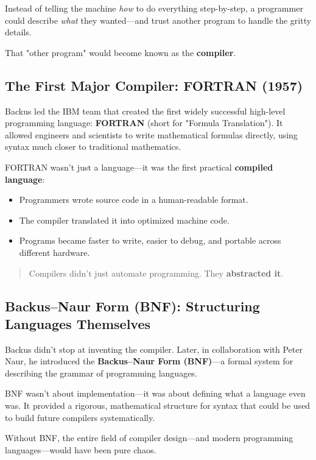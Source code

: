 Instead of telling the machine \textit{how} to do everything step-by-step, a programmer could describe \textit{what} they wanted—and trust another program to handle the gritty details.

That "other program" would become known as the \textbf{compiler}.

\subsection{The First Major Compiler: FORTRAN (1957)}

Backus led the IBM team that created the first widely successful high-level programming language: \textbf{FORTRAN} (short for "Formula Translation"). It allowed engineers and scientists to write mathematical formulas directly, using syntax much closer to traditional mathematics.

FORTRAN wasn't just a language—it was the first practical \textbf{compiled language}:

\begin{itemize} \item Programmers wrote source code in a human-readable format. \item The compiler translated it into optimized machine code. \item Programs became faster to write, easier to debug, and portable across different hardware. \end{itemize}

\begin{quote} Compilers didn’t just automate programming.
They \textbf{abstracted it}. \end{quote}

\subsection{Backus–Naur Form (BNF): Structuring Languages Themselves}

Backus didn’t stop at inventing the compiler.
Later, in collaboration with Peter Naur, he introduced the \textbf{Backus–Naur Form (BNF)}—a formal system for describing the grammar of programming languages.

BNF wasn’t about implementation—it was about defining what a language even was. It provided a rigorous, mathematical structure for syntax that could be used to build future compilers systematically.

Without BNF, the entire field of compiler design—and modern programming languages—would have been pure chaos.

